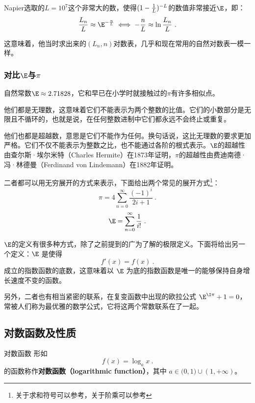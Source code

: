 Napier选取的$L=10^7$这个非常大的数，使得$(1-{1\over L})^{-L}$的数值非常接近$\E$，即：
\begin{equation}
{L_n\over L}\approx\E^{-{n\over L}}\iff-{n\over L}\approx\ln{L_n\over L}~.
\end{equation}

这意味着，他当时求出来的$(L_n,n)$对数表，几乎和现在常用的自然对数表一模一样。

\subsubsection{对比$\E$与$\pi$}

自然常数$\E \approx 2.71828$，它和早已在小学时就接触过的$\pi$有许多相似点。

他们都是无理数，这意味着它们不能表示为两个整数的比值。它们的小数部分是无限且不循环的，也就是说，在任何整数进制中它们都永远不会终止或重复。

他们也都是超越数，意思是它们不能作为任何。换句话说，这比无理数的要求更加严格。它们不仅不能表示为整数之比，也不能通过各阶的根式表示。$\E$的超越性由查尔斯·埃尔米特（Charles Hermite）在1873年证明，$\pi$的超越性由费迪南德·冯·林德曼（Ferdinand von Lindemann）在1882年证明。

二者都可以用无穷展开的方式来表示，下面给出两个常见的展开方式\footnote{关于求和符号可以参考，关于阶乘可以参考}：
\begin{equation}
\pi=4\sum_{n=0}^\infty\frac{(-1)^i}{2i+1}~.
\end{equation}
\begin{equation}
\E=\sum_{n=0}^\infty\frac{1}{i!}~.
\end{equation}

$\E$的定义有很多种方式，除了之前提到的广为了解的极限定义。下面将给出另一个定义：$\E$ 是使得
\begin{equation}
f'(x) = f(x)~.
\end{equation}
成立的指数函数的底数，这意味着以 $\E$ 为底的指数函数是唯一的能够保持自身增长速度不变的函数。

另外，二者也有相当紧密的联系，在复变函数中出现的欧拉公式 $\E^{\I \pi} + 1 = 0$，常被人们称为最优雅的数学公式，它将这两个常数联系在了一起。

\subsection{对数函数及性质}

\begin{definition}{对数函数}
形如
\begin{equation}
f(x) = \log_a x~.
\end{equation}
的函数称作\textbf{对数函数（logarithmic function）}，其中 $a\in\mathbb (0,1)\cup(1,+\infty)$。
\end{definition}


